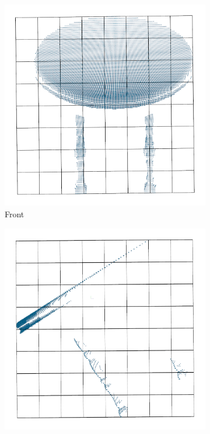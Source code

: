 \begin{figure}[!ht]
	\centering
	\hfill
	\begin{subfigure}{0.325\textwidth}
		\centering
		\includegraphics[width=\linewidth]{Figures/ObjRecog/fixed_front}
		\caption{Front}
		\label{subfig:objrecog:fixed:front}
	\end{subfigure}
	\hfill
	\begin{subfigure}{0.325\textwidth}
		\centering
		\includegraphics[width=\linewidth]{Figures/ObjRecog/fixed_side}

\end{subfigure}
\end{figure}
